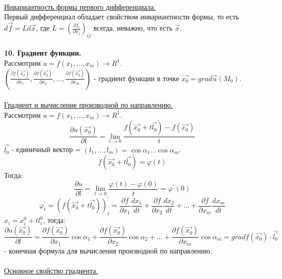 \documentclass[12pt]{article}
\begin{document}
\\
\label{question9_2}\underline{Инвариантность формы первого дифференциала.}\\
Первый дифференциал обладает свойством инвариантности формы, то есть $d\overrightarrow{f} = L d\overrightarrow{x}$, где $L = (\frac{\partial f_i}{\partial x_j})_{ij}$ всегда, неважно, что есть $\overrightarrow{x}$.\\
\\
\label{question10_1}\textbf{10. Градиент функции.}\\
Рассмотрим $u = f(x_1,\dots,x_m) \to R^1$.\\
$(\frac{\partial f(\overrightarrow{x_0})}{\partial x_1}, \frac{\partial f(\overrightarrow{x_0})}{\partial x_2}, \dots, \frac{\partial f(\overrightarrow{x_0})}{\partial x_m})$ - градиент функции в точке $\overrightarrow{x_0} = grad\overrightarrow{u}(M_0)$.\\
\\
\label{question10_2}\underline{Градиент и вычисление производной по направлению.}\\
Рассмотрим $u = f(x_1,\dots,x_m) \to R^1$.\\
$$\frac{\partial u(\overrightarrow{x_0})}{\partial l} = \lim_{t\to 0} \frac{f(\overrightarrow{x_0}+t\overrightarrow{l_0})-f(\overrightarrow{x_0})}{t}$$
$\overrightarrow{l_0}$ - единичный вектор = $(l_1, \dots, l_m) = \cos{\alpha_1} \dots \cos{\alpha_m}$.\\
$$f(\overrightarrow{x_0}+t\overrightarrow{l_0}) = \varphi(t)$$
Тогда:\\ $$\frac{\partial u}{\partial l} = \lim_{t\to 0} \frac{\varphi(t) - \varphi(0)}{t} = \varphi^{'}(0)$$
$$\varphi^{'}_t = (f(\overrightarrow{x_0}+t\overrightarrow{l_0}))^{'}_t = \frac{\partial f}{\partial x_1} \frac{d x_1}{d t} + \frac{\partial f}{\partial x_2} \frac{d x_2}{d t} + \dots + \frac{\partial f}{\partial x_m} \frac{d x_m}{d t}$$
$x_i = x_i^0 + tl_i^0$, тогда:\\
$$\frac{\partial u (\overrightarrow{x_0})}{\partial l} = \frac{\partial f(\overrightarrow{x_0})}{\partial x_1} \cos{\alpha_1} + \frac{\partial f(\overrightarrow{x_0})}{\partial x_2} \cos{\alpha_2} + \dots + \frac{\partial f(\overrightarrow{x_0})}{\partial x_m} \cos{\alpha_m} = gradf(\overrightarrow{x_0}) \cdot \overrightarrow{l_0}$$ - конечная формула для вычисления производной по направлению.\\
\\
\label{question10_3}\underline{Основное свойство градиента.}\\
\end{document}
